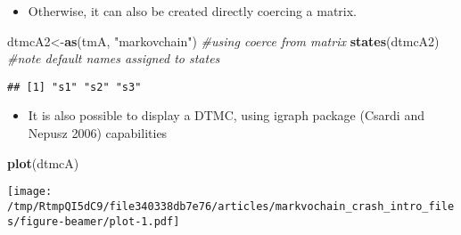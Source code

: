 \documentclass[ignorenonframetext,]{beamer}
\newenvironment{Shaded}{\begin{snugshade}}{\end{snugshade}}
\newcommand{\CommentTok}[1]{\textcolor[rgb]{0.56,0.35,0.01}{\textit{#1}}}
\newcommand{\KeywordTok}[1]{\textcolor[rgb]{0.13,0.29,0.53}{\textbf{#1}}}
\newcommand{\NormalTok}[1]{#1}
\newcommand{\StringTok}[1]{\textcolor[rgb]{0.31,0.60,0.02}{#1}}
\providecommand{\tightlist}{%
  \setlength{\itemsep}{0pt}\setlength{\parskip}{0pt}}
\providecommand{\tightlist}{
  \setlength{\itemsep}{0pt}\setlength{\parskip}{0pt}
}
\begin{document}
\begin{frame}[fragile]

\begin{itemize}
\tightlist
\item
  Otherwise, it can also be created directly coercing a matrix.
\end{itemize}

\begin{Shaded}
\begin{Highlighting}[]
\NormalTok{dtmcA2<-}\KeywordTok{as}\NormalTok{(tmA, }\StringTok{"markovchain"}\NormalTok{) }\CommentTok{#using coerce from matrix}
\KeywordTok{states}\NormalTok{(dtmcA2) }\CommentTok{#note default names assigned to states}
\end{Highlighting}
\end{Shaded}

\begin{verbatim}
## [1] "s1" "s2" "s3"
\end{verbatim}

\end{frame}

\begin{frame}[fragile]

\begin{itemize}
\tightlist
\item
  It is also possible to display a DTMC, using igraph package (Csardi
  and Nepusz 2006) capabilities
\end{itemize}

\begin{Shaded}
\begin{Highlighting}[]
\KeywordTok{plot}\NormalTok{(dtmcA)}
\end{Highlighting}
\end{Shaded}

\texttt{[image: /tmp/RtmpQI5dC9/file340338db7e76/articles/markvochain\_crash\_intro\_files/figure-beamer/plot-1.pdf]}

\end{frame}
\end{document}
